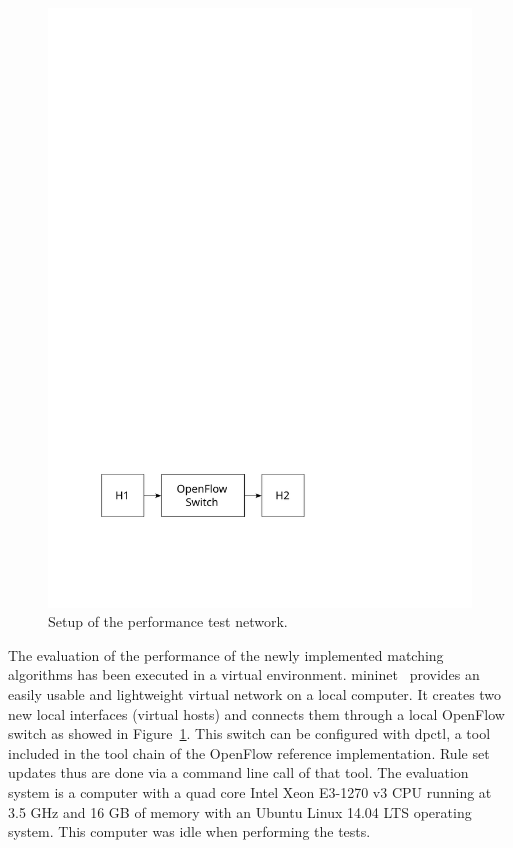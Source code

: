 \documentclass[a4paper,
		12pt,
		parskip=full,
		titlepage
		]{scrartcl}
\begin{document}
\begin{figure}[H]
\centering
\includegraphics[height=0.1\textheight]{images/ofswitch-perftest}
\caption{Setup of the performance test network.}
\label{fig:ofswitch-perftest}
\end{figure}

The evaluation of the performance of the newly implemented matching algorithms has been executed in a virtual environment.
\textsf{mininet}~\cite{mininet} provides an easily usable and lightweight virtual network on a local computer.
It creates two new local interfaces (virtual hosts) and connects them through 
a local OpenFlow switch as showed in Figure~\ref{fig:ofswitch-perftest}.
This switch can be configured with \textsf{dpctl}, a tool included in the tool chain of the OpenFlow reference implementation.
Rule set updates thus are done via a command line call of that tool.
The evaluation system is a computer with a quad core Intel Xeon E3-1270 v3 CPU 
running at 3.5 GHz and 16 GB of memory with an Ubuntu Linux 14.04 LTS operating system.
This computer was idle when performing the tests.
\end{document}
